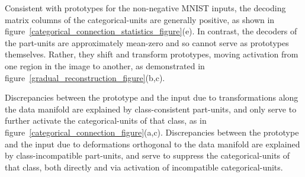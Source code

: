 \documentclass{article} %
\begin{document}
Consistent with prototypes for the non-negative MNIST inputs, the decoding matrix columns of the categorical-units are generally positive, as shown in figure~\ref{categorical_connection_statistics_figure}(e).  In contrast, the decoders of the part-units are approximately mean-zero and so cannot serve as prototypes themselves.  Rather, they shift and transform prototypes, moving activation from one region in the image to another, as demonstrated in figure~\ref{gradual_reconstruction_figure}(b,c).



Discrepancies between the prototype and the input due to transformations along the data manifold are explained by class-consistent part-units, and only serve to further activate the categorical-units of that class, as in figure~\ref{categorical_connection_figure}(a,c).
Discrepancies between the prototype and the input due to deformations orthogonal to the data manifold are explained by class-incompatible part-units, and serve to suppress the categorical-units of that class, both directly and via activation of incompatible categorical-units.  %
\end{document}
